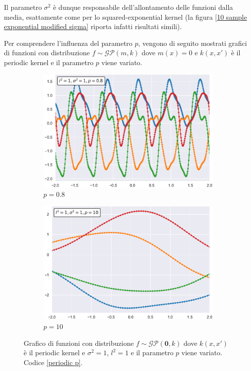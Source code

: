 Il parametro $\sigma^2$ è dunque responsabile dell'allontamento delle funzioni dalla media, esattamente come per lo squared-exponential kernel (la figura \ref{10 sample exponential modified sigma} riporta infatti risultati simili).


\newpage

Per comprendere l'influenza del parametro $p$, vengono di seguito mostrati grafici di funzioni con distribuzione $f\sim \mathcal{GP}(m,k)$ dove $m(x)=0$ e $k(x,x')$ è il periodic kernel e il parametro $p$ viene variato.

\begin{figure}[h]
\centering
\begin{subfigure}{.5\textwidth}
  \centering
  \includegraphics[width=\linewidth]{images/Gaussian process/Periodic - p=08.pdf}
  \caption{$p=0.8$}
\end{subfigure}%
\begin{subfigure}{.5\textwidth}
  \centering
  \includegraphics[width=\linewidth]{images/Gaussian process/Periodic - p=10.pdf}
  \caption{$p=10$}
\end{subfigure}
\caption{Grafico di funzioni con distribuzione  $f\sim \mathcal{GP}(\bm{0},k)$ dove $k(x,x')$ è il periodic kernel e $\sigma^2=1$, $l^2=1$ e il parametro $p$ viene variato. Codice \ref{periodic p}.}
\label{10 sample periodic modified p}
\end{figure}

